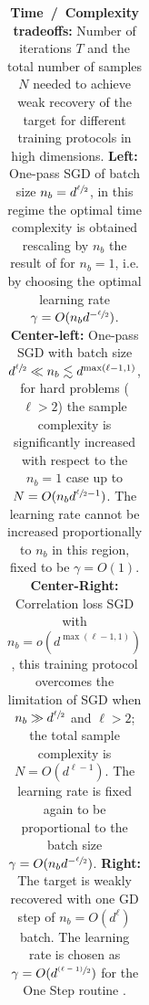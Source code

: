 \begin{table}
\begin{center}
\begin{tabular}{ccccc}
\bottomrule
\end{tabular}
\caption{\textbf{Time~/~Complexity tradeoffs:} Number of iterations $T$ and the total number of samples $N$ needed to achieve weak recovery of the target for different training protocols in high dimensions. \textbf{Left:} One-pass SGD of batch size $n_b = d^{\sfrac{\ell}{2}}$, in this regime the optimal time complexity is obtained rescaling by $n_b$ the result of \cite{arous2021online} for $n_b=1$, i.e. by choosing the optimal learning rate $\gamma = O(n_b d^{-\sfrac{\ell}{2}})$. \textbf{Center-left:} One-pass SGD with batch size $d^{\sfrac{\ell}{2}} \ll n_b \lesssim d^{{\rm max} (\ell-1,1)}$, for hard problems ($\ell > 2$) the sample complexity is significantly increased with respect to the $n_b=1$ case up to $N = O(n_bd^{\sfrac{\ell}{2}-1})$. The learning rate cannot be increased proportionally to $n_b$ in this region, fixed to be $\gamma = O(1)$. \textbf{Center-Right:} Correlation loss SGD with $n_b = o(d^{\max(\ell-1, 1)})$, this training protocol overcomes the limitation of SGD when $n_b \gg d^{\sfrac{\ell}{2}}$ and $\ell >2$; the total sample complexity is $N=O(d^{\ell-1})$. The learning rate is fixed again to be proportional to the batch size $\gamma = O(n_bd^{-\sfrac{\ell}{2}})$. \textbf{Right:} The target is weakly recovered with one GD step of $n_b=O(d^\ell)$ batch. The learning rate is chosen as $\gamma = O( d^{\sfrac{(\ell-1)}{2}})$ for the One Step routine \cite{dandi2023how}.
} 
\label{2406:table:weak_recovery}
\end{center}
\end{table}

